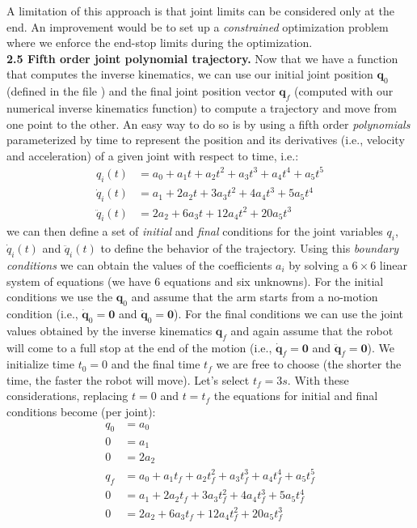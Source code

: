 \documentclass[11pt]{article}
\begin{document}
A limitation of this approach is that joint limits can be considered only at the end. An improvement would be to set up a \textit{constrained} optimization problem where we enforce the end-stop limits during the optimization.\\




\textbf{2.5 Fifth order joint polynomial trajectory.} Now that we have a function that computes the inverse kinematics, we can use our initial joint position $\mathbf{q}_0$(defined in the file ) and the final joint position vector $\mathbf{q}_f$ (computed with our numerical inverse kinematics function) to compute a trajectory and move from one point to the other. An easy way to do so is by using a fifth order \textit{polynomials} parameterized by time to represent the position and its derivatives (i.e., velocity and acceleration) of a given joint with respect to time, i.e.:
%
\begin{align*}
	q_i(t) &= a_0  + a_1 t +  a_2 t^2 + a_3 t^3 + a_4 t^4 + a_5 t^5\\
	\dot{q}_i(t) &= a_1 + 2 a_2 t + 3a_3 t^2 + 4 a_4 t^3 + 5 a_5 t^4\\
	\ddot{q}_i(t) &= 2 a_2 + 6 a_3 t + 12 a_4 t^2 + 20 a_5 t^3
\end{align*} 
%
we can then define a set of \textit{initial} and \textit{final} conditions for the joint variables $q_i$, $\dot{q}_i(t)$ and $\ddot{q}_i(t)$  to define the behavior of the trajectory. 
Using this \textit{boundary conditions} we can obtain the values of the coefficients $a_i$ by solving a $6\times 6$ linear system of equations (we have 6 equations and six unknowns). 
For the initial conditions we use the $\mathbf{q}_0$ and assume that the arm starts from a no-motion condition (i.e., $\dot{\mathbf{q}}_0 = \mathbf{0}$ and $\ddot{\mathbf{q}}_0 = \mathbf{0}$). 
For the final conditions we can use the joint values obtained by the inverse kinematics $\mathbf{q}_f$ and again assume that the robot will come to a full stop at the end of the motion (i.e., $\dot{\mathbf{q}}_f = \mathbf{0}$ and $\ddot{\mathbf{q}}_f = \mathbf{0}$). We initialize time $t_0 = 0$ and the final time $t_f$ we are free to choose (the shorter the time, the faster the robot will move). Let's select $t_f = 3s$. With these considerations, replacing $t = 0$ and $t = t_f$ the equations for initial and final conditions become (per joint):
%
\begin{align*}
	q_0 &= a_0  \\
	0 &= a_1 \\
	0 &= 2 a_2 \\
	q_f &= a_0  + a_1 t_f +  a_2 t_f^2 + a_3 t_f^3 + a_4 t_f^4 + a_5 t_f^5\\
	0 &= a_1 + 2 a_2 t_f + 3a_3 t_f^2 + 4 a_4 t_f^3 + 5 a_5 t_f^4\\
	0 &= 2 a_2 + 6 a_3 t_f + 12 a_4 t_f^2 + 20 a_5 t_f^3
\end{align*}
\end{document}
